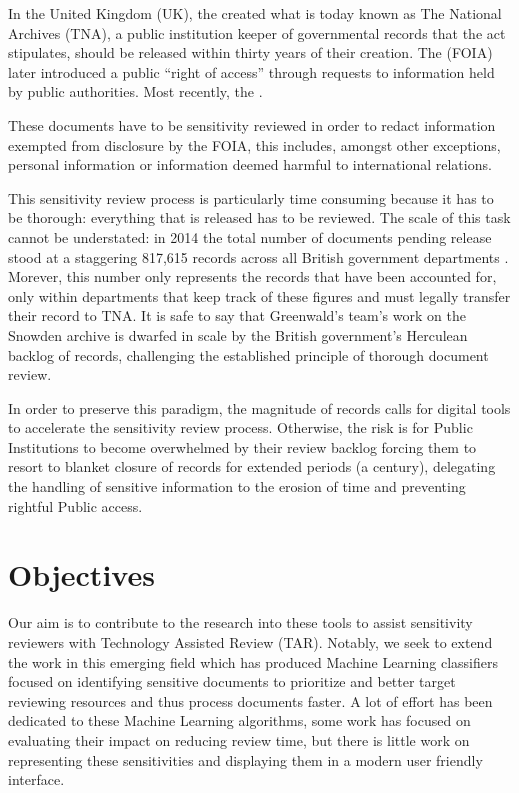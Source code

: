 \documentclass[\version]{l4proj}
\begin{document}
In the United Kingdom (UK), the \textcite{PublicRecordsAct1958} created what is today known as The National Archives (TNA), a public institution keeper of governmental records that the act stipulates, should be released within thirty years of their creation.
The \textcite{FreedomInformationAct2000} (FOIA) later introduced a public ``right of access'' through requests to information held by public authorities.
Most recently, the \textcite{ConstitutionalReformGovernance2010}.

These documents have to be sensitivity reviewed in order to redact information exempted from disclosure by the FOIA, this includes, amongst other exceptions, personal information or information deemed harmful to international relations.

This sensitivity review process is particularly time consuming because it has to be thorough: everything that is released has to be reviewed.
The scale of this task cannot be understated: in 2014 the total number of documents pending release stood at a staggering 817,615 records across all British government departments \autocite{allanRecordsReview2014,thenationalarchivesRecordTransferReport2014}.
Morever, this number only represents the records that have been accounted for, only within departments that keep track of these figures and must legally transfer their record to TNA.
It is safe to say that Greenwald's team's work on the Snowden archive is dwarfed in scale by the British government's Herculean backlog of records, challenging the established principle of thorough document review.

In order to preserve this paradigm, the magnitude of records calls for digital tools to accelerate the sensitivity review process.
Otherwise, the risk is for Public Institutions to become overwhelmed by their review backlog forcing them to resort to blanket closure of records for extended periods (a century), delegating the handling of sensitive information to the erosion of time and preventing rightful Public access.

\section{Objectives}

Our aim is to contribute to the research into these tools to assist sensitivity reviewers with Technology Assisted Review (TAR).
Notably, we seek to extend the work in this emerging field which has produced Machine Learning classifiers focused on identifying sensitive documents to prioritize and better target reviewing resources and thus process documents faster.
A lot of effort has been dedicated to these Machine Learning algorithms, some work has focused on evaluating their impact on reducing review time, but there is little work on representing these sensitivities and displaying them in a modern user friendly interface.
\end{document}
